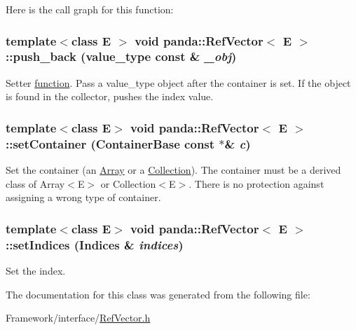 Here is the call graph for this function:\hypertarget{classpanda_1_1RefVector_a8ab84690e691574c7ec1d908f87d3bef}{
\subsubsection[{push\_\-back}]{\setlength{\rightskip}{0pt plus 5cm}template$<$class E $>$ void {\bf panda::RefVector}$<$ E $>$::push\_\-back ({\bf value\_\-type} const \& {\em \_\-obj})}}
\label{classpanda_1_1RefVector_a8ab84690e691574c7ec1d908f87d3bef}


Setter \hyperlink{namespacepanda_1_1function}{function}. Pass a value\_\-type object after the container is set. If the object is found in the collector, pushes the index value. \hypertarget{classpanda_1_1RefVector_aa820237bf37060e712958a33cce074fd}{
\subsubsection[{setContainer}]{\setlength{\rightskip}{0pt plus 5cm}template$<$class E$>$ void {\bf panda::RefVector}$<$ E $>$::setContainer ({\bf ContainerBase} const $\ast$\& {\em c})}}
\label{classpanda_1_1RefVector_aa820237bf37060e712958a33cce074fd}


Set the container (an \hyperlink{classpanda_1_1Array}{Array} or a \hyperlink{classpanda_1_1Collection}{Collection}). The container must be a derived class of Array$<$E$>$ or Collection$<$E$>$. There is no protection against assigning a wrong type of container. \hypertarget{classpanda_1_1RefVector_ad892af7b109e53efa169067dd58c5118}{
\subsubsection[{setIndices}]{\setlength{\rightskip}{0pt plus 5cm}template$<$class E$>$ void {\bf panda::RefVector}$<$ E $>$::setIndices ({\bf Indices} \& {\em indices})}}
\label{classpanda_1_1RefVector_ad892af7b109e53efa169067dd58c5118}


Set the index. 

The documentation for this class was generated from the following file:\begin{DoxyCompactItemize}
\item 
Framework/interface/\hyperlink{RefVector_8h}{RefVector.h}\end{DoxyCompactItemize}
